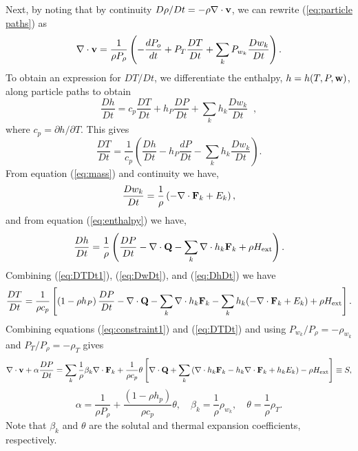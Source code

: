 \documentclass[final]{siamltex}
\def\Fb {{\bf F}}
\def\Qb {{\bf Q}}
\def\vb {{\bf v}}
\def\wb {{\bf w}}
\def\Hext {H_{\rm ext}}
\begin{document}
Next, by noting that by continuity $D\rho/Dt = -\rho\nabla\cdot\vb$, 
we can rewrite 
(\ref{eq:particle paths}) as
\begin{equation}
\nabla\cdot\vb = \frac{1}{\rho P_\rho}\left(-\frac{dP_o}{dt} + P_T\frac{DT}{Dt} + \sum_kP_{w_k}\frac{Dw_k}{Dt}\right).\label{eq:constraint1}
\end{equation}
To obtain an expression for $DT/Dt$, we differentiate the enthalpy, $h=h(T,P,\wb)$, 
along particle paths to obtain
\begin{equation}
\frac{Dh}{Dt} = 
c_p \frac{DT}{Dt} 
+ h_P\frac{DP}{Dt} + \sum_k h_{k}\frac{Dw_k}{Dt}  \;\;  ,
\end{equation}
where $c_p = \partial h/\partial T$.  This gives
\begin{equation}
\frac{DT}{Dt} = \frac{1}{c_p}\left(\frac{Dh}{Dt} - h_P\frac{dP}{Dt} - \sum_kh_{k}\frac{Dw_k}{Dt}\right).\label{eq:DTDt1}
\end{equation}
From equation (\ref{eq:mass}) and continuity we have,
\begin{equation}
\frac{Dw_k}{Dt} = \frac{1}{\rho}\left(-\nabla\cdot\Fb_k + E_k\right),\label{eq:DwDt}
\end{equation}
and from equation (\ref{eq:enthalpy}) we have,
\begin{equation}
\frac{Dh}{Dt} = \frac{1}{\rho}\left(\frac{DP}{Dt} - \nabla\cdot\Qb - \sum_k\nabla\cdot h_k\Fb_k + \rho\Hext\right).\label{eq:DhDt}
\end{equation}
Combining (\ref{eq:DTDt1}), (\ref{eq:DwDt}), and (\ref{eq:DhDt}) we have
\begin{equation}
\frac{DT}{Dt} = \frac{1}{\rho c_p}\left[\left(1 - \rho h_P\right)\frac{DP}{Dt} - \nabla\cdot\Qb - \sum_k\nabla\cdot h_k\Fb_k - \sum_kh_k(-\nabla\cdot\Fb_k + E_k) + \rho\Hext\right].\label{eq:DTDt}
\end{equation}
Combining equations (\ref{eq:constraint1}) and (\ref{eq:DTDt})
and using $P_{w_k}/P_\rho = -\rho_{w_k}$ and $P_T/P_\rho = -\rho_T$ gives
\begin{equation}
\nabla\cdot\vb + \alpha\frac{DP}{Dt} = \sum_k \frac{1}{\rho}\beta_k \nabla\cdot\Fb_k + \frac{1}{\rho c_p}\theta\left[\nabla\cdot\Qb + \sum_k\left(\nabla\cdot h_k\Fb_k - h_k\nabla\cdot\Fb_k + h_kE_k\right) - \rho\Hext\right] \equiv S,\label{eq:constraint}
\end{equation}
\begin{equation}
\alpha = \frac{1}{\rho P_\rho} + \frac{(1-\rho h_p)}{\rho c_p}\theta, \quad
\beta_k = \frac{1}{\rho}\rho_{w_k}, \quad
\theta = \frac{1}{\rho}\rho_T.\label{eq:thermo deriv}
\end{equation}
Note that $\beta_k$ and $\theta$
are the solutal and thermal expansion coefficients, respectively.
\end{document}
